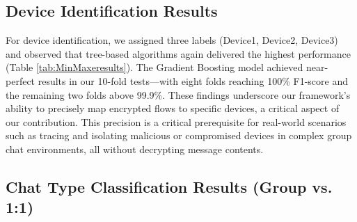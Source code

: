 \documentclass[conference]{IEEEtran}
\begin{document}
\subsection{Device Identification Results}
For device identification, we assigned three labels (Device1, Device2, Device3) and observed that tree-based algorithms again delivered the highest performance (Table \ref{tab:MinMaxeresults}). The Gradient Boosting model achieved near-perfect results in our 10-fold tests—with eight folds reaching 100\% F1-score and the remaining two folds above 99.9\%. These findings underscore our framework's ability to precisely map encrypted flows to specific devices, a critical aspect of our contribution. This precision is a critical prerequisite for real-world scenarios such as tracing and isolating malicious or compromised devices in complex group chat environments, all without decrypting message contents.

\begin{table*}[!ht]
\centering
\caption{Group vs 1:1 user action classification for each IMA app for \textbf{Gradient Boosting}}
\label{tab:MLDevresults} 
\end{table*}

\subsection{Chat Type Classification Results (Group vs. 1:1)}
\end{document}
